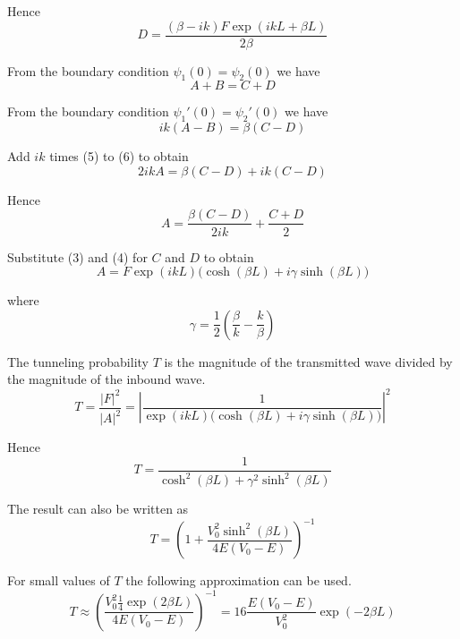 Hence
\begin{equation*}
D=\frac{(\beta-ik)F\exp(ikL+\beta L)}{2\beta}
\tag{4}
\end{equation*}

From the boundary condition $\psi_1(0)=\psi_2(0)$ we have
\begin{equation*}
A+B=C+D
\tag{5}
\end{equation*}

From the boundary condition $\psi_1'(0)=\psi_2'(0)$ we have
\begin{equation*}
ik(A-B)=\beta(C-D)
\tag{6}
\end{equation*}

Add $ik$ times (5) to (6) to obtain
\begin{equation*}
2ikA=\beta(C-D)+ik(C-D)
\end{equation*}

Hence
\begin{equation*}
A=\frac{\beta(C-D)}{2ik}+\frac{C+D}{2}
\end{equation*}

Substitute (3) and (4) for $C$ and $D$ to obtain
\begin{equation*}
A = F\exp(ikL)\bigl(\cosh(\beta L)+i\gamma\sinh(\beta L)\bigr)
\tag{7}
\end{equation*}

where
\begin{equation*}
\gamma=\frac{1}{2}\left(\frac{\beta}{k}-\frac{k}{\beta}\right)
\end{equation*}

The tunneling probability $T$ is the magnitude of the transmitted
wave divided by the magnitude of the inbound wave.
\begin{equation*}
T=\frac{|F|^2}{|A|^2}
=\left|\frac{1}{\exp(ikL)\bigl(\cosh(\beta L)+i\gamma\sinh(\beta L)\bigr)}\right|^2
\end{equation*}

Hence
\begin{equation*}
T=\frac{1}{\cosh^2(\beta L)+\gamma^2\sinh^2(\beta L)}
\tag{8}
\end{equation*}

The result can also be written as
\begin{equation*}
T=\left(1+\frac{V_0^2\sinh^2(\beta L)}{4E(V_0-E)}\right)^{-1}
\tag{9}
\end{equation*}

For small values of $T$ the following approximation can be used.
\begin{equation*}
T\approx\left(\frac{V_0^2\frac{1}{4}\exp(2\beta L)}{4E(V_0-E)}\right)^{-1}
=16\frac{E(V_0-E)}{V_0^2}\exp(-2\beta L)
\end{equation*}

